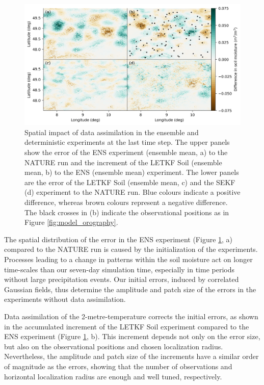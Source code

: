 \documentclass[hess, manuscript]{copernicus}
\begin{document}
\begin{figure}[ht]
	\includegraphics{figures/fig_06_spatial_impact.png}
	\caption{
		Spatial impact of data assimilation in the ensemble and deterministic experiments at the last time step.
		The upper panels show the error of the ENS experiment (ensemble mean, a) to the NATURE run and the increment of the LETKF Soil (ensemble mean, b) to the ENS (ensemble mean) experiment.
		The lower panels are the error of the LETKF Soil (ensemble mean, c) and the SEKF (d) experiment to the NATURE run.
		Blue colours indicate a positive difference, whereas brown colours represent a negative difference.
		The black crosses in (b) indicate the observational positions as in Figure \ref{fig:model_orography}.
	}
	\label{fig:spatial_impact}
\end{figure}


The spatial distribution of the error in the ENS experiment (Figure \ref{fig:spatial_impact}, a) compared to the NATURE run is caused by the initialization of the experiments.
Processes leading to a change in patterns within the soil moisture act on longer time-scales than our seven-day simulation time, especially in time periods without large precipitation events.
Our initial errors, induced by correlated Gaussian fields, thus determine the amplitude and patch size of the errors in the experiments without data assimilation.

Data assimilation of the 2-metre-temperature corrects the initial errors, as shown in the accumulated increment of the LETKF Soil experiment compared to the ENS experiment (Figure \ref{fig:spatial_impact}, b).
This increment depends not only on the error size, but also on the observational positions and chosen localization radius.
Nevertheless, the amplitude and patch size of the increments have a similar order of magnitude as the errors, showing that the number of observations and horizontal localization radius are enough and well tuned, respectively.
\end{document}
